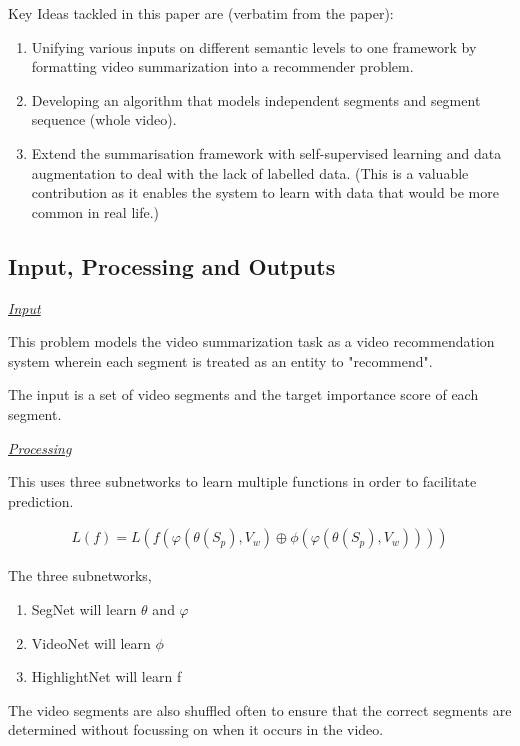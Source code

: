     	Key Ideas tackled in this paper are (verbatim from the paper):
    	
    	\begin{enumerate}
    		\item Unifying various inputs on different semantic levels to one framework by formatting video summarization into a recommender problem.
    		\item Developing an algorithm that models independent segments and segment sequence (whole video).
    		\item Extend the summarisation framework with self-supervised learning and data augmentation to deal with the lack of labelled data. (This is a valuable contribution as it enables the system to learn with data that would be more common in real life.)
    	\end{enumerate}
	
    \subsection{Input, Processing and Outputs}
    	
    	\textit{\underline{Input}}
    	
    		This problem models the video summarization task as a video recommendation system wherein each segment is treated as an entity to "recommend". 
    		
    		The input is a set of video segments and the target importance score of each segment.
    		
    	\textit{\underline{Processing}}
    	
    		This uses three subnetworks to learn multiple functions in order to facilitate prediction. 
    		
    		\begin{align}
    			L(f) = L(f(\varphi(\theta(S_p),V_w) \oplus\phi(\varphi(\theta(S_p),V_w))))
    		\end{align}
    		
    		The three subnetworks,
    		
    		\begin{enumerate}
    			\item SegNet will learn \(\theta\) and \(\varphi\)
    			\item VideoNet will learn \(\phi\)
    			\item HighlightNet will learn f
    		\end{enumerate}
    		
    		The video segments are also shuffled often to ensure that the correct segments are determined without focussing on when it occurs in the video.
    		
